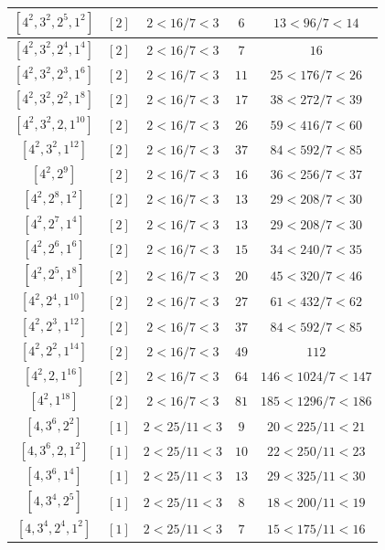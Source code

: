 \documentclass{article}%
\begin{document}
\begin{center}
\begin{longtable}{||c|c|c|c|c||}
$[4^{2}, 3^{2}, 2^{5}, 1^{2}]$ & $[2]$ & $2 < 16/7 < 3$ & $6$ & $13 < 96/7 < 14$ \\ \hline 
$[4^{2}, 3^{2}, 2^{4}, 1^{4}]$ & $[2]$ & $2 < 16/7 < 3$ & $7$ & $16$ \\ \hline 
$[4^{2}, 3^{2}, 2^{3}, 1^{6}]$ & $[2]$ & $2 < 16/7 < 3$ & $11$ & $25 < 176/7 < 26$ \\ \hline 
$[4^{2}, 3^{2}, 2^{2}, 1^{8}]$ & $[2]$ & $2 < 16/7 < 3$ & $17$ & $38 < 272/7 < 39$ \\ \hline 
$[4^{2}, 3^{2}, 2, 1^{10}]$ & $[2]$ & $2 < 16/7 < 3$ & $26$ & $59 < 416/7 < 60$ \\ \hline 
$[4^{2}, 3^{2}, 1^{12}]$ & $[2]$ & $2 < 16/7 < 3$ & $37$ & $84 < 592/7 < 85$ \\ \hline 
$[4^{2}, 2^{9}]$ & $[2]$ & $2 < 16/7 < 3$ & $16$ & $36 < 256/7 < 37$ \\ \hline 
$[4^{2}, 2^{8}, 1^{2}]$ & $[2]$ & $2 < 16/7 < 3$ & $13$ & $29 < 208/7 < 30$ \\ \hline 
$[4^{2}, 2^{7}, 1^{4}]$ & $[2]$ & $2 < 16/7 < 3$ & $13$ & $29 < 208/7 < 30$ \\ \hline 
$[4^{2}, 2^{6}, 1^{6}]$ & $[2]$ & $2 < 16/7 < 3$ & $15$ & $34 < 240/7 < 35$ \\ \hline 
$[4^{2}, 2^{5}, 1^{8}]$ & $[2]$ & $2 < 16/7 < 3$ & $20$ & $45 < 320/7 < 46$ \\ \hline 
$[4^{2}, 2^{4}, 1^{10}]$ & $[2]$ & $2 < 16/7 < 3$ & $27$ & $61 < 432/7 < 62$ \\ \hline 
$[4^{2}, 2^{3}, 1^{12}]$ & $[2]$ & $2 < 16/7 < 3$ & $37$ & $84 < 592/7 < 85$ \\ \hline 
$[4^{2}, 2^{2}, 1^{14}]$ & $[2]$ & $2 < 16/7 < 3$ & $49$ & $112$ \\ \hline 
$[4^{2}, 2, 1^{16}]$ & $[2]$ & $2 < 16/7 < 3$ & $64$ & $146 < 1024/7 < 147$ \\ \hline 
$[4^{2}, 1^{18}]$ & $[2]$ & $2 < 16/7 < 3$ & $81$ & $185 < 1296/7 < 186$ \\ \hline 
$[4, 3^{6}, 2^{2}]$ & $[1]$ & $2 < 25/11 < 3$ & $9$ & $20 < 225/11 < 21$ \\ \hline 
$[4, 3^{6}, 2, 1^{2}]$ & $[1]$ & $2 < 25/11 < 3$ & $10$ & $22 < 250/11 < 23$ \\ \hline 
$[4, 3^{6}, 1^{4}]$ & $[1]$ & $2 < 25/11 < 3$ & $13$ & $29 < 325/11 < 30$ \\ \hline 
$[4, 3^{4}, 2^{5}]$ & $[1]$ & $2 < 25/11 < 3$ & $8$ & $18 < 200/11 < 19$ \\ \hline 
$[4, 3^{4}, 2^{4}, 1^{2}]$ & $[1]$ & $2 < 25/11 < 3$ & $7$ & $15 < 175/11 < 16$ \\ \hline 

\end{longtable}
\end{center}
\end{document}
